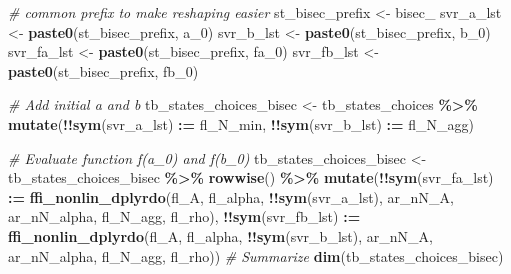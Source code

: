 \documentclass[
]{book}
\newenvironment{Shaded}{\begin{snugshade}}{\end{snugshade}}
\newcommand{\CommentTok}[1]{\textcolor[rgb]{0.56,0.35,0.01}{\textit{#1}}}
\newcommand{\ErrorTok}[1]{\textcolor[rgb]{0.64,0.00,0.00}{\textbf{#1}}}
\newcommand{\KeywordTok}[1]{\textcolor[rgb]{0.13,0.29,0.53}{\textbf{#1}}}
\newcommand{\NormalTok}[1]{#1}
\newcommand{\OperatorTok}[1]{\textcolor[rgb]{0.81,0.36,0.00}{\textbf{#1}}}
\newcommand{\StringTok}[1]{\textcolor[rgb]{0.31,0.60,0.02}{#1}}
\begin{document}
\begin{Shaded}
\begin{Highlighting}[]
\CommentTok{\# common prefix to make reshaping easier}
\NormalTok{st\_bisec\_prefix \textless{}{-}}\StringTok{ \textquotesingle{}bisec\_\textquotesingle{}}
\NormalTok{svr\_a\_lst \textless{}{-}}\StringTok{ }\KeywordTok{paste0}\NormalTok{(st\_bisec\_prefix, }\StringTok{\textquotesingle{}a\_0\textquotesingle{}}\NormalTok{)}
\NormalTok{svr\_b\_lst \textless{}{-}}\StringTok{ }\KeywordTok{paste0}\NormalTok{(st\_bisec\_prefix, }\StringTok{\textquotesingle{}b\_0\textquotesingle{}}\NormalTok{)}
\NormalTok{svr\_fa\_lst \textless{}{-}}\StringTok{ }\KeywordTok{paste0}\NormalTok{(st\_bisec\_prefix, }\StringTok{\textquotesingle{}fa\_0\textquotesingle{}}\NormalTok{)}
\NormalTok{svr\_fb\_lst \textless{}{-}}\StringTok{ }\KeywordTok{paste0}\NormalTok{(st\_bisec\_prefix, }\StringTok{\textquotesingle{}fb\_0\textquotesingle{}}\NormalTok{)}

\CommentTok{\# Add initial a and b}
\NormalTok{tb\_states\_choices\_bisec \textless{}{-}}\StringTok{ }\NormalTok{tb\_states\_choices }\OperatorTok{\%\textgreater{}\%}
\StringTok{  }\KeywordTok{mutate}\NormalTok{(}\OperatorTok{!!}\KeywordTok{sym}\NormalTok{(svr\_a\_lst) }\OperatorTok{:}\ErrorTok{=}\StringTok{ }\NormalTok{fl\_N\_min, }\OperatorTok{!!}\KeywordTok{sym}\NormalTok{(svr\_b\_lst) }\OperatorTok{:}\ErrorTok{=}\StringTok{ }\NormalTok{fl\_N\_agg)}

\CommentTok{\# Evaluate function f(a\_0) and f(b\_0)}
\NormalTok{tb\_states\_choices\_bisec \textless{}{-}}\StringTok{ }\NormalTok{tb\_states\_choices\_bisec }\OperatorTok{\%\textgreater{}\%}
\StringTok{  }\KeywordTok{rowwise}\NormalTok{() }\OperatorTok{\%\textgreater{}\%}
\StringTok{  }\KeywordTok{mutate}\NormalTok{(}\OperatorTok{!!}\KeywordTok{sym}\NormalTok{(svr\_fa\_lst) }\OperatorTok{:}\ErrorTok{=}\StringTok{ }\KeywordTok{ffi\_nonlin\_dplyrdo}\NormalTok{(fl\_A, fl\_alpha, }\OperatorTok{!!}\KeywordTok{sym}\NormalTok{(svr\_a\_lst),}
\NormalTok{                                                ar\_nN\_A, ar\_nN\_alpha,}
\NormalTok{                                                fl\_N\_agg, fl\_rho),}
         \OperatorTok{!!}\KeywordTok{sym}\NormalTok{(svr\_fb\_lst) }\OperatorTok{:}\ErrorTok{=}\StringTok{ }\KeywordTok{ffi\_nonlin\_dplyrdo}\NormalTok{(fl\_A, fl\_alpha, }\OperatorTok{!!}\KeywordTok{sym}\NormalTok{(svr\_b\_lst),}
\NormalTok{                                                ar\_nN\_A, ar\_nN\_alpha,}
\NormalTok{                                                fl\_N\_agg, fl\_rho))}
\CommentTok{\# Summarize}
\KeywordTok{dim}\NormalTok{(tb\_states\_choices\_bisec)}
\end{Highlighting}
\end{Shaded}
\end{document}

